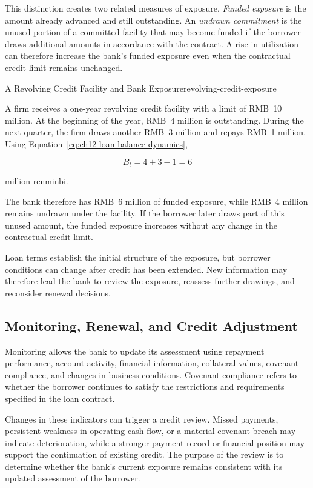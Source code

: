 This distinction creates two related measures of exposure. \emph{Funded exposure} is the amount already advanced and still outstanding. An \emph{undrawn commitment} is the unused portion of a committed facility that may become funded if the borrower draws additional amounts in accordance with the contract. A rise in utilization can therefore increase the bank's funded exposure even when the contractual credit limit remains unchanged.

\begin{example}{A Revolving Credit Facility and Bank Exposure}{revolving-credit-exposure}

A firm receives a one-year revolving credit facility with a limit of RMB~10 million. At the beginning of the year, RMB~4 million is outstanding. During the next quarter, the firm draws another RMB~3 million and repays RMB~1 million. Using Equation~\ref{eq:ch12-loan-balance-dynamics},

\[
B_t=4+3-1=6
\]

million renminbi.

The bank therefore has RMB~6 million of funded exposure, while RMB~4 million remains undrawn under the facility. If the borrower later draws part of this unused amount, the funded exposure increases without any change in the contractual credit limit.

\end{example}

Loan terms establish the initial structure of the exposure, but borrower conditions can change after credit has been extended. New information may therefore lead the bank to review the exposure, reassess further drawings, and reconsider renewal decisions.

\subsection{Monitoring, Renewal, and Credit Adjustment}

Monitoring allows the bank to update its assessment using repayment performance, account activity, financial information, collateral values, covenant compliance, and changes in business conditions. Covenant compliance refers to whether the borrower continues to satisfy the restrictions and requirements specified in the loan contract.

Changes in these indicators can trigger a credit review. Missed payments, persistent weakness in operating cash flow, or a material covenant breach may indicate deterioration, while a stronger payment record or financial position may support the continuation of existing credit. The purpose of the review is to determine whether the bank's current exposure remains consistent with its updated assessment of the borrower.

